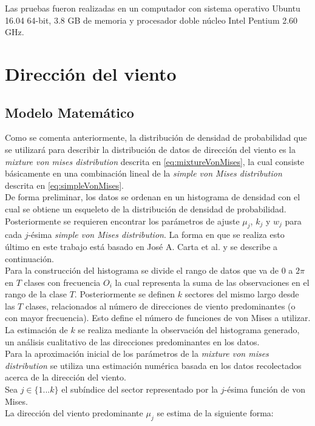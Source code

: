 Las pruebas fueron realizadas en un computador con sistema operativo Ubuntu 16.04 64-bit, 3.8 GB de memoria y procesador doble núcleo Intel Pentium 2.60 GHz. 

\section{Dirección del viento}
\subsection{Modelo Matemático} 
Como se comenta anteriormente, la distribución de densidad de probabilidad que se utilizará para describir la distribución de datos de dirección del viento
es la \emph{mixture von mises distribution} descrita en \ref{eq:mixtureVonMises}, la cual consiste básicamente en una combinación lineal de la \emph{simple von Mises distribution} descrita en \ref{eq:simpleVonMises}.\\ 
De forma preliminar, los datos se ordenan en un histograma de densidad con el cual se obtiene un esqueleto de la distribución de densidad de probabilidad. Posteriormente se requieren encontrar los parámetros de ajuste $\mu_j$, $k_j$ y $w_j$ para cada $j$-ésima \emph{simple von Mises distribution}. La forma en que
se realiza esto último en este trabajo está basado en José A. Carta et al. \cite{Carta07} y se describe a continuación.\\
Para la construcción del histograma se divide el rango de datos que va de 0 a $2\pi$ en $T$ clases con frecuencia $O_i$ la cual representa la suma de las observaciones en el rango de la clase $T$. Posteriormente se definen $k$ sectores del mismo largo desde las $T$ clases, relacionados al número de direcciones de viento predominantes (o con mayor frecuencia). Esto define el número de funciones de von Mises a utilizar. La estimación de $k$ se realiza mediante la observación del histograma generado, un análisis cualitativo de las direcciones predominantes en los datos.\\
Para la aproximación inicial de los parámetros de la \emph{mixture von mises distribution} se utiliza una estimación numérica basada en los datos recolectados acerca de la dirección del viento.\\
Sea $j \in \{1 ... k\}$ el subíndice del sector representado por la $j$-ésima función de von Mises.\\
La dirección del viento predominante $\mu_j$ se estima de la siguiente forma:
